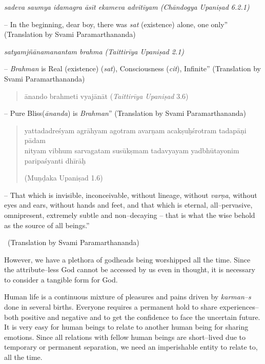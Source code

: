 \textit{sadeva saumya idamagra āsīt ekameva advitīyam  (Chāndogya Upaniṣad 6.2.1)}

\begin{myquote}
– In the beginning, dear boy, there was \textit{sat} (existence) alone, one only” (Translation by Svami Paramarthananda)
\end{myquote}

\newpage

\textit{satyamjñānamanantam brahma  (Taittirīya Upaniṣad 2.1)}

\begin{myquote}
– \textit{Brahman} is Real (existence) (\textit{sat}), Consciousness (\textit{cit}), Infinite” (Translation by Svami Paramarthananda)
\end{myquote}

\begin{verse}
ānando brahmeti vyajānāt  (\textit{Taittirīya Upaniṣad} 3.6)
\end{verse}

\begin{myquote}
– Pure Bliss(\textit{ānanda}) is \textit{Brahman}” (Translation by Svami Paramarthananda)
\end{myquote}

\begin{verse}
yattadadreśyam agrāhyam agotram avarṇam acakṣuḥśrotram tadapāṇi pādam \\ nityam vibhum sarvagatam susūkṣmam tadavyayam yadbhūtayonim paripaśyanti dhīrāḥ  
\begin{flushright}
(Muṇḍaka Upaniṣad 1.6)
\end{flushright}
\end{verse}

\begin{myquote}
– That which is invisible, inconceivable, without lineage, without \textit{varṇa}, without eyes and ears, without hands and feet, and that which is eternal, all–pervasive, omnipresent, extremely subtle and non–decaying – that is what the wise behold as the source of all beings.” 
\end{myquote}


~\hfill (Translation by Svami Paramarthananda)

However, we have a plethora of godheads being worshipped all the time. Since the attribute–less God cannot be accessed by us even in thought, it is necessary to consider a tangible form for God.

Human life is a continuous mixture of pleasures and pains driven by \textit{karman–s} done in several births. Everyone requires a permanent hold to share experiences– both positive and negative and to get the confidence to face the uncertain future. It is very easy for human beings to relate to another human being for sharing emotions. Since all relations with fellow human beings are short–lived due to temporary or permanent separation, we need an imperishable entity to relate to, all the time.

